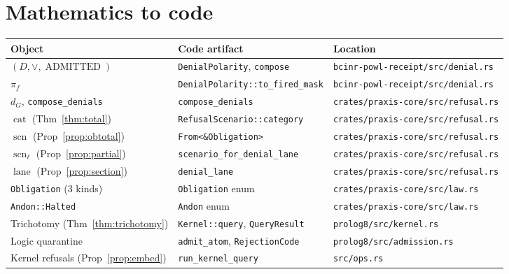\documentclass[11pt,oneside]{book}
\theoremstyle{definition}
\theoremstyle{plain}
\theoremstyle{remark}
\newcommand{\code}[1]{\texttt{#1}}
\newcommand{\Deny}{D}                 %
\newcommand{\Adml}{\operatorname{ADMITTED}}          %
\newcommand{\firedmap}{\pi_{f}}                %
\DeclareMathOperator{\catop}{cat}
\DeclareMathOperator{\laneop}{lane}
\DeclareMathOperator{\scnop}{scn}
\begin{document}
\section*{Mathematics to code}
\begin{center}
\begin{tabular}{lll}
\toprule
Object & Code artifact & Location\\
\midrule
$(\Deny,\lor,\Adml)$ & \code{DenialPolarity}, \code{compose} & \code{bcinr-powl-receipt/src/denial.rs}\\
$\firedmap$ & \code{DenialPolarity::to\_fired\_mask} & \code{bcinr-powl-receipt/src/denial.rs}\\
$d_G$, \code{compose\_denials} & \code{compose\_denials} & \code{crates/praxis-core/src/refusal.rs}\\
$\catop$ (Thm~\ref{thm:total}) & \code{RefusalScenario::category} & \code{crates/praxis-core/src/refusal.rs}\\
$\scnop$ (Prop~\ref{prop:obtotal}) & \code{From<\&Obligation>} & \code{crates/praxis-core/src/refusal.rs}\\
$\scnop_\ell$ (Prop~\ref{prop:partial}) & \code{scenario\_for\_denial\_lane} & \code{crates/praxis-core/src/refusal.rs}\\
$\laneop$ (Prop~\ref{prop:section}) & \code{denial\_lane} & \code{crates/praxis-core/src/refusal.rs}\\
\code{Obligation} (3 kinds) & \code{Obligation} enum & \code{crates/praxis-core/src/law.rs}\\
\code{Andon::Halted} & \code{Andon} enum & \code{crates/praxis-core/src/law.rs}\\
Trichotomy (Thm~\ref{thm:trichotomy}) & \code{Kernel::query}, \code{QueryResult} & \code{prolog8/src/kernel.rs}\\
Logic quarantine & \code{admit\_atom}, \code{RejectionCode} & \code{prolog8/src/admission.rs}\\
Kernel refusals (Prop~\ref{prop:embed}) & \code{run\_kernel\_query} & \code{src/ops.rs}\\
\bottomrule
\end{tabular}
\end{center}
\end{document}
